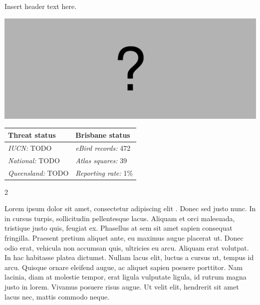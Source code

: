 \documentclass[12pt,openany,oneside]{book}
\let\origfigure\figure
\let\endorigfigure\endfigure
\renewenvironment{figure}[1][2] {
  \expandafter\origfigure\expandafter[H]
} {
  \endorigfigure
}
\let\Begin\begin
\let\End\end
\theoremstyle{definition}
\theoremstyle{definition}
\theoremstyle{definition}
\theoremstyle{remark}
\begin{document}

Insert header text here.

\begin{figure}
\centering
\includegraphics[width=\textwidth,keepaspectratio=true]{assets/misc/missing-profile.png}
\caption{Insert caption here.}
\end{figure}

\begin{tabu} to 
\toprule
Threat status & Brisbane status\\
\midrule
\textit{IUCN:} TODO & \textit{eBird records:} 472\\
\textit{National:} TODO & \textit{Atlas squares:} 39\\
\textit{Queensland:} TODO & \textit{Reporting rate:} 1\%\\
\bottomrule
\end{tabu} 
\vspace{0.15cm}

\Begin{multicols}{2}

Lorem ipsum dolor sit amet, consectetur adipiscing elit
\citep{rexample1, rexample2, rexample3}. Donec sed justo nunc. In in
cursus turpis, sollicitudin pellentesque lacus. Aliquam et orci
malesuada, tristique justo quis, feugiat ex. Phasellus at sem sit amet
sapien consequat fringilla. Praesent pretium aliquet ante, eu maximus
augue placerat ut. Donec odio erat, vehicula non accumsan quis,
ultricies eu arcu. Aliquam erat volutpat. In hac habitasse platea
dictumst. Nullam lacus elit, luctus a cursus ut, tempus id arcu. Quisque
ornare eleifend augue, ac aliquet sapien posuere porttitor. Nam lacinia,
diam at molestie tempor, erat ligula vulputate ligula, id rutrum magna
justo in lorem. Vivamus posuere risus augue. Ut velit elit, hendrerit
sit amet lacus nec, mattis commodo neque.

\End{multicols}

\clearpage
\end{document}
